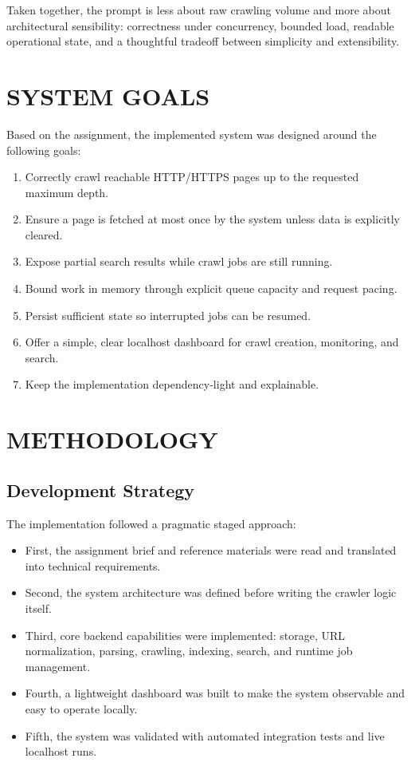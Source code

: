 \documentclass[pdftex,12pt,a4paper]{article}
\begin{document}
Taken together, the prompt is less about raw crawling volume and more about architectural sensibility: correctness under concurrency, bounded load, readable operational state, and a thoughtful tradeoff between simplicity and extensibility.

\section{SYSTEM GOALS}
\label{sec:system_goals}

Based on the assignment, the implemented system was designed around the following goals:

\begin{enumerate}
    \item Correctly crawl reachable HTTP/HTTPS pages up to the requested maximum depth.
    \item Ensure a page is fetched at most once by the system unless data is explicitly cleared.
    \item Expose partial search results while crawl jobs are still running.
    \item Bound work in memory through explicit queue capacity and request pacing.
    \item Persist sufficient state so interrupted jobs can be resumed.
    \item Offer a simple, clear localhost dashboard for crawl creation, monitoring, and search.
    \item Keep the implementation dependency-light and explainable.
\end{enumerate}

\section{METHODOLOGY}
\label{sec:methodology}

\subsection{Development Strategy}

The implementation followed a pragmatic staged approach:

\begin{itemize}
    \item First, the assignment brief and reference materials were read and translated into technical requirements.
    \item Second, the system architecture was defined before writing the crawler logic itself.
    \item Third, core backend capabilities were implemented: storage, URL normalization, parsing, crawling, indexing, search, and runtime job management.
    \item Fourth, a lightweight dashboard was built to make the system observable and easy to operate locally.
    \item Fifth, the system was validated with automated integration tests and live localhost runs.
\end{itemize}
\end{document}
